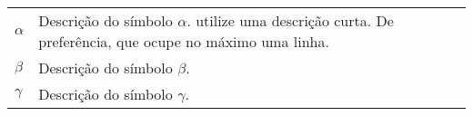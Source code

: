 

\begin{table}[!ht]
  \begin{tabular}{p{1cm}p{14cm}}
	$\alpha$  & Descrição do símbolo $\alpha$. utilize uma descrição curta. De preferência, que ocupe no máximo uma linha.\\
	$\beta$   & Descrição do símbolo $\beta$. \\
	$\gamma$  & Descrição do símbolo $\gamma$. 
  \end{tabular}
\end{table}